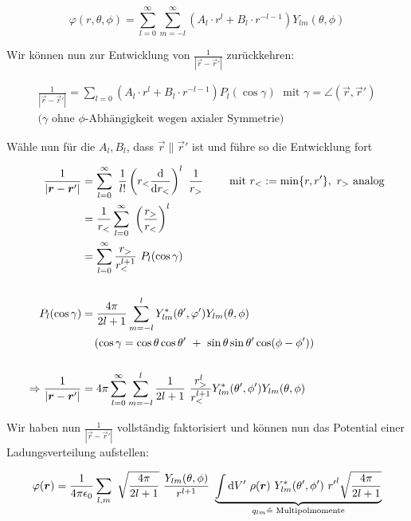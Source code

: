 \begin{equation*}
\varphi(r,\theta,\phi) = \sum_{l=0}^{\infty}\sum_{m=-l}^{\infty} \left(A_l \cdot r^l + B_l \cdot r^{-l-1}\right) Y_{lm}(\theta,\phi)
\end{equation*}

Wir können nun zur Entwicklung von $\frac{1}{|\vec{r} - \vec{r}'|}$ zurückkehren:

\begin{align*}
\frac{1}{|\vec{r} - \vec{r}'|} = \sum_{l=0} \left(A_l \cdot r^l + B_l \cdot r^{-l-1}\right) P_l(\cos\gamma) \; \text{ mit } \gamma = \angle\left(\vec{r},\vec{r}'\right)\\
(\gamma\text{ ohne $\phi$-Abhängigkeit wegen axialer Symmetrie)}
\end{align*}

Wähle nun für die $A_l, B_l$, dass $\vec{r}\parallel\vec{r}'$ ist und führe so die Entwicklung fort

\begin{align*}
\frac{1}{|\vec{r}-\vec{r}'|} &= \sum_{l=0}^{\infty} \ \frac{1}{l!} \left(\-r_{<}\diff{}{r_{<}}\right)^l \ \frac{1}{r_{>}} \qquad \text{ mit } r_{<} := \min\{r,r'\}, \ r_{>} \text{ analog}\\
&= \frac{1}{r_{<}}\sum_{l=0}^{\infty} \ \left(\frac{r_{>}}{r_{<}}\right)^l\\
&=  \sum_{l=0}^{\infty} \frac{r_{>}}{r_{<}^{l+1}} \ P_l (\cos\gamma)\\
\\
P_l (\cos\gamma) &= \frac{4\pi}{2l+1}\sum_{m=-l}^{l}  Y^{*}_{lm}(\theta',\varphi')Y_{lm}(\theta,\phi)\\
& \quad\left(\cos\gamma = \cos\theta\cos\theta' \ + \ \sin\theta\sin\theta'\cos(\phi-\phi')\right)\\
\\
\Rightarrow \frac{1}{|\vec{r}-\vec{r}'|} &= 4\pi \sum_{l=0}^{\infty}\sum_{m=-l}^{l} \frac{1}{2l+1}\ \frac{r_{>}^l}{r_{<}^{l+1}} Y^{*}_{lm}(\theta',\phi')Y_{lm}(\theta,\phi)
\end{align*}

Wir haben nun $\frac{1}{|\vec{r}-\vec{r}'|}$ vollständig faktorisiert und können nun das Potential einer Ladungsverteilung aufstellen:

\begin{equation*}
\varphi (\vec{r}) = \frac{1}{4\pi\epsilon_0} \sum_{l,m} \ \sqrt{\frac{4\pi}{2l +1}} \ \frac{Y_{lm}(\theta,\phi)}{r^{l+1}} \ \underbrace{\int\d V' \  \rho(\vec{r}) \  Y_{lm}^{*}(\theta',\phi') \ {r'}^l \sqrt{\frac{4\pi}{2l+1}}}_{q_{lm} \hat{=} \text{ Multipolmomente}}
\end{equation*}

